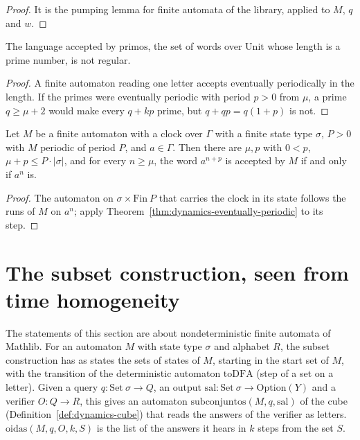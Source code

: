 \begin{proof}
  \leanok
  It is the pumping lemma for finite automata of the library, applied to $M$, $q$ and $w$.
\end{proof}

\begin{theorem}
  \label{thm:dynamics-primes-not-regular}
  \leanok
  The language accepted by $\mathrm{primos}$, the set of words over $\mathrm{Unit}$ whose length is
  a prime number, is not regular.
  \own{}
\end{theorem}

\begin{proof}
  \leanok
  A finite automaton reading one letter accepts eventually periodically in the length. If the
  primes were eventually periodic with period $p > 0$ from $\mu$, a prime $q \ge \mu + 2$ would
  make every $q + kp$ prime, but $q + qp = q(1+p)$ is not.
\end{proof}

\begin{theorem}
  \label{thm:dynamics-floquet}
  \leanok
  Let $M$ be a finite automaton with a clock over $\Gamma$ with a finite state type $\sigma$,
  $P > 0$ with $M$ periodic of period $P$, and $a \in \Gamma$. Then there are $\mu, p$ with
  $0 < p$, $\mu + p \le P \cdot |\sigma|$, and for every $n \ge \mu$, the word $a^{n+p}$ is
  accepted by $M$ if and only if $a^{n}$ is.
  \own{}
\end{theorem}

\begin{proof}
  \leanok
  The automaton on $\sigma \times \mathrm{Fin}\ P$ that carries the clock in its state follows the
  runs of $M$ on $a^n$; apply Theorem~\ref{thm:dynamics-eventually-periodic} to its step.
\end{proof}

\section{The subset construction, seen from time homogeneity}
\label{sec:dynamics-subsets}

The statements of this section are about nondeterministic finite automata of Mathlib. For an
automaton $M$ with state type $\sigma$ and alphabet $R$, the subset construction has as states the
sets of states of $M$, starting in the start set of $M$, with the transition of the deterministic
automaton $\mathrm{toDFA}$ (step of a set on a letter). Given a query $q : \mathrm{Set}\ \sigma \to
Q$, an output $\mathrm{sal} : \mathrm{Set}\ \sigma \to \mathrm{Option}(Y)$ and a verifier
$O : Q \to R$, this gives an automaton $\mathrm{subconjuntos}(M, q, \mathrm{sal})$ of the cube
(Definition~\ref{def:dynamics-cube}) that reads the answers of the verifier as letters.
$\mathrm{oidas}(M, q, O, k, S)$ is the list of the answers it hears in $k$ steps from the set $S$.

